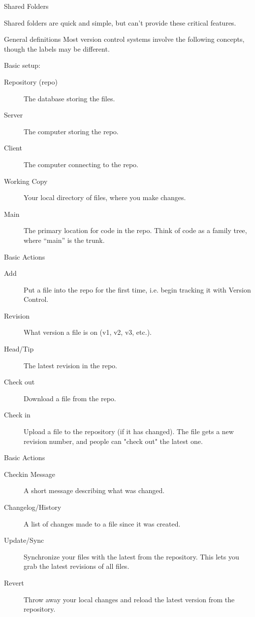 \begin{frame}{Shared Folders}
\begin{alertenv}
Shared folders are quick and simple, but can't provide these critical
features.
\end{alertenv}
\end{frame}

\begin{frame}{General definitions}
Most version control systems involve the following concepts, though the
labels may be different.

Basic setup:

\begin{description}
\item[Repository (repo)] The database storing the files.
\item[Server] The computer storing the repo.
\item[Client] The computer connecting to the repo.
\item[Working Copy] Your local directory of files,
  where you make changes.
\item[Main] The primary location for code in the repo.
  Think of code as a family tree, where ``main'' is the trunk.
\end{description}
\end{frame}

\begin{frame}{Basic Actions}
\begin{description}
\item[Add] Put a file into the repo for the first time, i.e.
  begin tracking it with Version Control.
\item[Revision] What version a file is on (v1, v2, v3, etc.).
\item[Head/Tip] The latest revision in the repo.
\item[Check out] Download a file from the repo.
\item[Check in] Upload a file to the repository (if it has
  changed). The file gets a new revision number, and people can "check
  out" the latest one.
\end{description}
\end{frame}
\begin{frame}{Basic Actions}
\begin{description}
\item[Checkin Message] A short message describing what was
  changed.
\item[Changelog/History] A list of changes made to a file since
  it was created.
\item[Update/Sync] Synchronize your files with the latest from
  the repository. This lets you grab the latest revisions of all files.
\item[Revert] Throw away your local changes and reload the latest
  version from the repository.
\end{description}
\end{frame}

